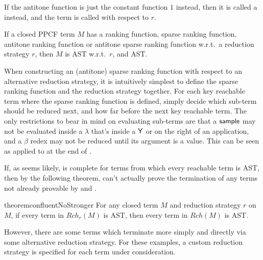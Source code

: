 If the antitone function is just the constant function $1$ instead, then it is called a  instead, and the term is called  with respect to $r$.

\begin{theorem} \label{thm:confluent ranking}
If a closed PPCF term $M$ has a ranking function, sparse ranking function, antitone ranking function or antitone sparse ranking function w.r.t.~a reduction strategy $r$, then $M$ is AST w.r.t.~$r$, and AST.
\end{theorem}

When constructing an (antitone) sparse ranking function with respect to an alternative reduction strategy, it is intuitively simplest to define the sparse ranking function and the reduction strategy together. For each key reachable term where the sparse ranking function is defined, simply decide which sub-term should be reduced next, and how far before the next key reachable term. The only restrictions to bear in mind on evaluating sub-terms are that a $\mathsf{sample}$ may not be evaluated inside a $\lambda$ that's inside a $\mathsf{Y}$ or on the right of an application, and a $\beta$ redex may not be reduced until its argument is a value. This can be seen as applied to  at the end of .

\medskip
If, as seems likely,  is complete for terms from which every reachable term is AST, then by the following theorem,  can't actually prove the termination of any terms not already provable by  and .

\begin{restatable}{theorem}{confluentNoStronger}
\label{thm:confluentNoStronger}
For any closed term $M$ and reduction strategy $r$ on $M$, if every term in $\mathit{Rch}_r(M)$ is AST, then every term in $\mathit{Rch}(M)$ is AST.
\end{restatable}

However, there are some terms which terminate more simply and directly via some alternative reduction strategy. For these examples, a custom reduction strategy is specified for each term under consideration.


